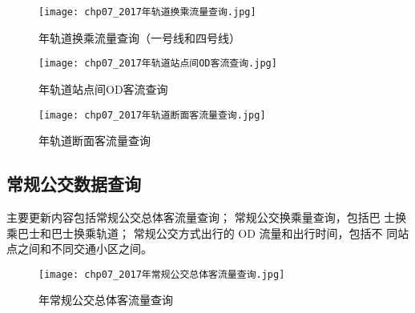 \begin{figure}[!ht]
  \centering
  \texttt{[image: chp07\_2017年轨道换乘流量查询.jpg]}
  \caption{\pyear 年轨道换乘流量查询（一号线和四号线）\label{fig:chp07_2017年轨道换乘流量查询} }
\end{figure}

\begin{figure}[!ht]
  \centering
  \texttt{[image: chp07\_2017年轨道站点间OD客流查询.jpg]}
  \caption{\pyear 年轨道站点间OD客流查询\label{fig:chp07_2017年轨道站点间OD客流查询} }
\end{figure}

\begin{figure}[!ht]
  \centering
  \texttt{[image: chp07\_2017年轨道断面客流量查询.jpg]}
  \caption{\pyear 年轨道断面客流量查询\label{fig:chp07_2017年轨道断面客流量查询} }
\end{figure}

\subsection{常规公交数据查询}
主要更新内容包括常规公交总体客流量查询； 常规公交换乘量查询，包括巴
士换乘巴士和巴士换乘轨道； 常规公交方式出行的 OD 流量和出行时间，包括不
同站点之间和不同交通小区之间。

\begin{figure}[!ht]
  \centering
  \texttt{[image: chp07\_2017年常规公交总体客流量查询.jpg]}
  \caption{\pyear 年常规公交总体客流量查询\label{fig:chp07_2017年常规公交总体客流量查询} }
\end{figure}

\makeatletter
\setlength{\@fptop}{0pt}
\makeatother
